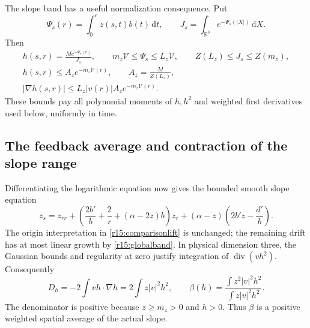 \documentclass[11pt]{article}
\numberwithin{equation}{section}
\newcommand{\dd}{\,\mathrm d}
\newcommand{\R}{\mathbb R}
\begin{document}
The slope band has a useful normalization consequence. Put
\[
 \Psi_s(r)=\int_0^r z(s,t)b(t)\dd t,\qquad
 J_s=\int_{\R^3}e^{-\Psi_s(|X|)}\dd X.
\]
Then
\begin{equation}\label{r15:gaussianconfinement}
 \begin{gathered}
 h(s,r)=\frac{M e^{-\Psi_s(r)}}{J_s},\qquad
 m_z\mathcal V\le\Psi_s\le L_z\mathcal V,\qquad
 Z(L_z)\le J_s\le Z(m_z),\\
 h(s,r)\le A_ze^{-m_z\mathcal V(r)},\qquad A_z=\frac{M}{Z(L_z)},\\
 |\nabla h(s,r)|\le L_z|v(r)|A_ze^{-m_z\mathcal V(r)}.
 \end{gathered}
\end{equation}
These bounds pay all polynomial moments of $h,h^2$ and weighted first
derivatives used below, uniformly in time.

\subsection{The feedback average and contraction of the slope range}

Differentiating the logarithmic equation now gives the bounded smooth
slope equation
\begin{equation}\label{r15:slopeequation}
 z_s=z_{rr}+
 \left(\frac{2b'}b+\frac2r+(\alpha-2z)b\right)z_r
 +(\alpha-z)\left(2b'z-\frac{d'}b\right).
\end{equation}
The origin interpretation in \eqref{r15:comparisonlift} is unchanged;
the remaining drift has at most linear growth by
\eqref{r15:globalband}. In physical dimension three, the Gaussian
bounds and regularity at zero justify integration of
$\operatorname{div}(vh^2)$. Consequently
\begin{equation}\label{r15:betaaverage}
 D_h=-2\int vh\cdot\nabla h
       =2\int z|v|^2h^2,\qquad
 \beta(h)=\frac{\int z^2|v|^2h^2}{\int z|v|^2h^2}.
\end{equation}
The denominator is positive because $z\ge m_z>0$ and $h>0$.
Thus $\beta$ is a positive weighted spatial average of the actual slope.
\end{document}
